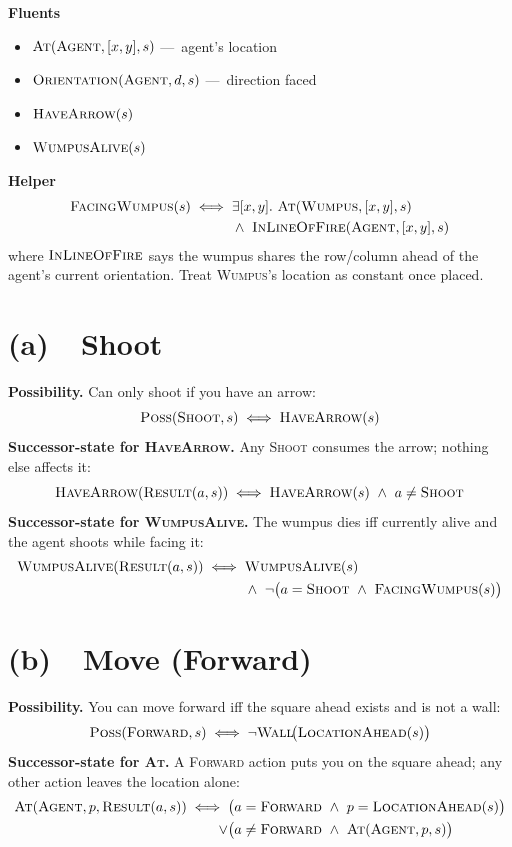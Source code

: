 \documentclass[11pt,a4paper]{article}
\newcommand{\pred}[1]{\textsc{#1}}
\newcommand{\Result}{\pred{Result}}
\newcommand{\Poss}{\pred{Poss}}
\begin{document}
\textbf{Fluents}
\begin{itemize}[leftmargin=*,itemsep=1pt]
  \item $\pred{At}(\pred{Agent}, [x,y], s)$ \quad ---\ agent's location
  \item $\pred{Orientation}(\pred{Agent}, d, s)$ \quad ---\ direction faced
  \item $\pred{HaveArrow}(s)$
  \item $\pred{WumpusAlive}(s)$
\end{itemize}

\textbf{Helper}
\begin{align*}
  \pred{FacingWumpus}(s) \iff{}& \exists [x,y].\ \pred{At}(\pred{Wumpus}, [x,y], s)\\
                              & \wedge\ \pred{InLineOfFire}(\pred{Agent}, [x,y], s)
\end{align*}
where $\pred{InLineOfFire}$ says the wumpus shares the row/column ahead of the agent's current orientation. Treat \pred{Wumpus}'s location as constant once placed.

\section*{(a)\ \ Shoot}

\begin{tcolorbox}[colback=gray!5,colframe=gray!50!black]
\textbf{Possibility.} Can only shoot if you have an arrow:
\[
  \Poss(\pred{Shoot}, s) \iff \pred{HaveArrow}(s)
\]
\textbf{Successor-state for \pred{HaveArrow}.} Any \pred{Shoot} consumes the arrow; nothing else affects it:
\[
  \pred{HaveArrow}(\Result(a, s)) \iff \pred{HaveArrow}(s) \ \wedge\ a \neq \pred{Shoot}
\]
\textbf{Successor-state for \pred{WumpusAlive}.} The wumpus dies iff currently alive and the agent shoots while facing it:
\begin{align*}
  \pred{WumpusAlive}(\Result(a, s)) \iff{}&
  \pred{WumpusAlive}(s)\\
  & \wedge\ \neg\big(a = \pred{Shoot} \ \wedge\ \pred{FacingWumpus}(s)\big)
\end{align*}
\end{tcolorbox}

\section*{(b)\ \ Move (Forward)}

\begin{tcolorbox}[colback=gray!5,colframe=gray!50!black]
\textbf{Possibility.} You can move forward iff the square ahead exists and is not a wall:
\[
  \Poss(\pred{Forward}, s) \iff \neg\pred{Wall}\!\big(\pred{LocationAhead}(s)\big)
\]
\textbf{Successor-state for \pred{At}.} A \pred{Forward} action puts you on the square ahead; any other action leaves the location alone:
\begin{align*}
  \pred{At}(\pred{Agent}, p, \Result(a, s)) \iff{}&
  \big(a = \pred{Forward} \ \wedge\ p = \pred{LocationAhead}(s)\big)\\
  \vee{}& \big(a \neq \pred{Forward} \ \wedge\ \pred{At}(\pred{Agent}, p, s)\big)
\end{align*}
\end{tcolorbox}
\end{document}
